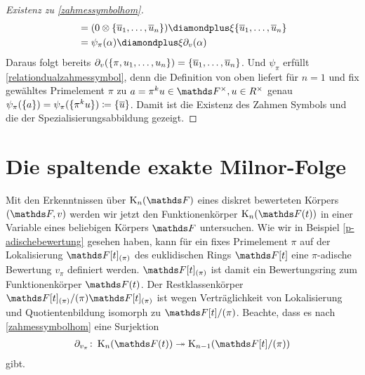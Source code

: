 \documentclass[ngerman,fontsize=11pt, paper=a4, parskip=half, titlepage=true, toc=bib]{scrartcl}
\begin{document}
\begin{proof}[Existenz zu \ref{zahmessymbolhom}]
\begin{align*}
    &=(0\otimes\{\ov u_1,\dotsc,\ov u_n\})
      \p\xi\{\ov u_1,\dotsc,\ov u_n\}\\
    &=\psi_\pi(\alpha) \p \xi\partial_v(\alpha)
  \end{align*}
  Daraus folgt bereits
  $\partial_v(\{\pi,u_1,\dotsc,u_n\})=\{\overline u_1,\dotsc,\overline u_n\}$.  
  Und $\psi_\pi$ erfüllt \ref{relationdualzahmessymbol}, denn 
  die Definition von oben liefert für $n=1$ und fix gewähltes
  Primelement $\pi$ zu $a=\pi^ku\in\Fx, u\in\Rx$ genau
  $\psi_\pi(\{a\})=\psi_\pi(\{\pi^ku\})\coloneqq\{\overline u\}$.
  Damit ist die Existenz des Zahmen Symbols und die der
  Spezialisierungsabbildung gezeigt.
\end{proof}




\section{Die spaltende exakte Milnor-Folge}

Mit den Erkenntnissen über $\KnF$ eines diskret bewerteten 
Körpers $(\F,v)$ werden wir jetzt den Funktionenkörper $\KnFt$ 
in einer Variable eines beliebigen Körpers $\F$ untersuchen. 
Wie wir in Beispiel \ref{p-adischebewertung} gesehen haben, 
kann für ein fixes Primelement $\pi$ auf der Lokalisierung 
$\F[t]_{(\pi)}$ des euklidischen Rings $\F[t]$ eine $\pi$-adische
Bewertung $v_\pi$ definiert werden. $\F[t]_{(\pi)}$ ist damit ein
Bewertungsring zum Funktionenkörper $\Ft $.
Der Restklassenkörper $\F[t]_{(\pi)}/(\pi)\F[t]_{(\pi)}$ ist wegen
Verträglichkeit von Lokalisierung und Quotientenbildung isomorph zu
$\F[t]/(\pi)$.
Beachte, dass es nach \ref{zahmessymbolhom} eine Surjektion
\begin{gather*}
  \partial_{v_\pi}\colon \KnFt\twoheadrightarrow \K_{n-1}(\Ftpi)
\end{gather*}
gibt.
\end{document}
